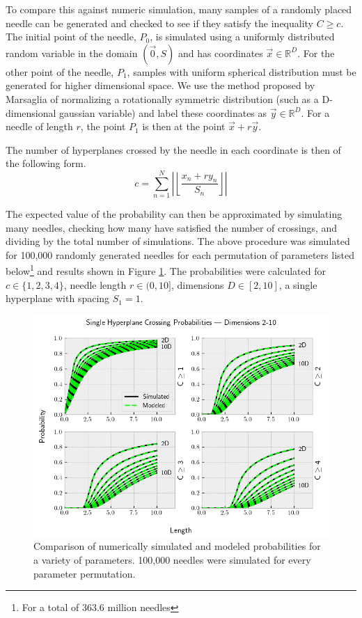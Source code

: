 \documentclass{article}
\begin{document}
To compare this against numeric simulation, many samples of a randomly placed needle can be generated and checked to
see if they satisfy the inequality $C\ge c$.
The initial point of the needle, $P_0$, is simulated using a uniformly distributed random variable in 
the domain $(\vec 0, S)$ and has coordinates $\vec x \in \mathbb{R}^D$. For the other point of the needle, $P_1$, samples 
with uniform spherical distribution must be generated for higher dimensional space. We use the method
proposed by Marsaglia  of normalizing a rotationally symmetric distribution 
(such as a D-dimensional gaussian variable) and label these coordinates as $\vec y \in \mathbb{R}^D$. For a needle of
length $r$, the point $P_1$ is then at the point $\vec x + r \vec y$.

The number of hyperplanes crossed by the needle in each coordinate is then of the following form.
\begin{equation}
	c = \sum_{n=1}^{N} \left|\left\lfloor \frac{x_n+r y_n}{S_n} \right\rfloor\right|
\end{equation}

The expected value of the probability can then be approximated by simulating many needles, checking
how many have satisfied the number of crossings, and dividing by the total number of simulations.
The above procedure was simulated for 100,000 randomly generated needles for each permutation of parameters
listed below\footnote{For a total of 363.6 million needles} and results shown in Figure \ref{fig:numeric sim N1}. The probabilities were calculated for
$c\in\{1,2,3,4\}$, needle length $r\in(0, 10]$, dimensions $D\in[2, 10]$, a single hyperplane with
spacing $S_1=1$.

\begin{figure}
	\centerline{\includegraphics[width=5in]{numeric_sim_N1.png}}
	\caption{Comparison of numerically simulated and modeled probabilities for a variety of parameters.
	100,000 needles were simulated for every parameter permutation.}
	\label{fig:numeric sim N1}
\end{figure}
\end{document}
